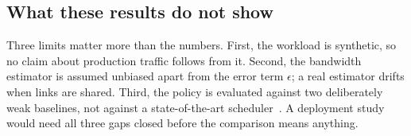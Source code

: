 \subsection{What these results do not show}

Three limits matter more than the numbers.
First, the workload is synthetic, so no claim about production traffic follows from it.
Second, the bandwidth estimator is assumed unbiased apart from the error term $\epsilon$; a real estimator drifts when links are shared.
Third, the policy is evaluated against two deliberately weak baselines, not against a state-of-the-art scheduler~\cite{smith2024,lee2025}.
A deployment study would need all three gaps closed before the comparison means anything.
